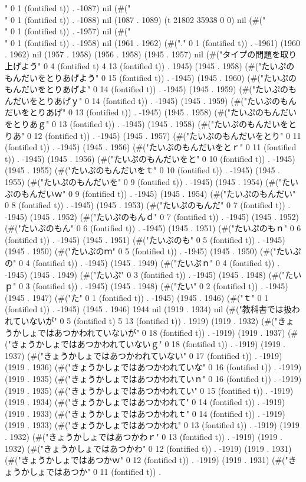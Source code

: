 " 0 1 (fontified t)) . -1087) nil (#("\\" 0 1 (fontified t)) . -1088) nil (1087 . 1089) (t 21802 35938 0 0) nil (#("\\" 0 1 (fontified t)) . -1957) nil (#("\\" 0 1 (fontified t)) . -1958) nil (1961 . 1962) (#("." 0 1 (fontified t)) . -1961) (1960 . 1962) nil (1957 . 1958) (1956 . 1958) (1945 . 1957) nil (#("タイプの問題を取り上げよう" 0 4 (fontified t) 4 13 (fontified t)) . 1945) (1945 . 1958) (#("たいぷのもんだいをとりあげよう" 0 15 (fontified t)) . -1945) (1945 . 1960) (#("たいぷのもんだいをとりあげよ" 0 14 (fontified t)) . -1945) (1945 . 1959) (#("たいぷのもんだいをとりあげｙ" 0 14 (fontified t)) . -1945) (1945 . 1959) (#("たいぷのもんだいをとりあげ" 0 13 (fontified t)) . -1945) (1945 . 1958) (#("たいぷのもんだいをとりあｇ" 0 13 (fontified t)) . -1945) (1945 . 1958) (#("たいぷのもんだいをとりあ" 0 12 (fontified t)) . -1945) (1945 . 1957) (#("たいぷのもんだいをとり" 0 11 (fontified t)) . -1945) (1945 . 1956) (#("たいぷのもんだいをとｒ" 0 11 (fontified t)) . -1945) (1945 . 1956) (#("たいぷのもんだいをと" 0 10 (fontified t)) . -1945) (1945 . 1955) (#("たいぷのもんだいをｔ" 0 10 (fontified t)) . -1945) (1945 . 1955) (#("たいぷのもんだいを" 0 9 (fontified t)) . -1945) (1945 . 1954) (#("たいぷのもんだいｗ" 0 9 (fontified t)) . -1945) (1945 . 1954) (#("たいぷのもんだい" 0 8 (fontified t)) . -1945) (1945 . 1953) (#("たいぷのもんだ" 0 7 (fontified t)) . -1945) (1945 . 1952) (#("たいぷのもんｄ" 0 7 (fontified t)) . -1945) (1945 . 1952) (#("たいぷのもん" 0 6 (fontified t)) . -1945) (1945 . 1951) (#("たいぷのもｎ" 0 6 (fontified t)) . -1945) (1945 . 1951) (#("たいぷのも" 0 5 (fontified t)) . -1945) (1945 . 1950) (#("たいぷのｍ" 0 5 (fontified t)) . -1945) (1945 . 1950) (#("たいぷの" 0 4 (fontified t)) . -1945) (1945 . 1949) (#("たいぷｎ" 0 4 (fontified t)) . -1945) (1945 . 1949) (#("たいぷ" 0 3 (fontified t)) . -1945) (1945 . 1948) (#("たいｐ" 0 3 (fontified t)) . -1945) (1945 . 1948) (#("たい" 0 2 (fontified t)) . -1945) (1945 . 1947) (#("た" 0 1 (fontified t)) . -1945) (1945 . 1946) (#("ｔ" 0 1 (fontified t)) . -1945) (1945 . 1946) 1944 nil (1919 . 1934) nil (#("教科書では扱われていないが" 0 5 (fontified t) 5 13 (fontified t)) . 1919) (1919 . 1932) (#("きょうかしょではあつかわれていないが" 0 18 (fontified t)) . -1919) (1919 . 1937) (#("きょうかしょではあつかわれていないｇ" 0 18 (fontified t)) . -1919) (1919 . 1937) (#("きょうかしょではあつかわれていない" 0 17 (fontified t)) . -1919) (1919 . 1936) (#("きょうかしょではあつかわれていな" 0 16 (fontified t)) . -1919) (1919 . 1935) (#("きょうかしょではあつかわれていｎ" 0 16 (fontified t)) . -1919) (1919 . 1935) (#("きょうかしょではあつかわれてい" 0 15 (fontified t)) . -1919) (1919 . 1934) (#("きょうかしょではあつかわれて" 0 14 (fontified t)) . -1919) (1919 . 1933) (#("きょうかしょではあつかわれｔ" 0 14 (fontified t)) . -1919) (1919 . 1933) (#("きょうかしょではあつかわれ" 0 13 (fontified t)) . -1919) (1919 . 1932) (#("きょうかしょではあつかわｒ" 0 13 (fontified t)) . -1919) (1919 . 1932) (#("きょうかしょではあつかわ" 0 12 (fontified t)) . -1919) (1919 . 1931) (#("きょうかしょではあつかｗ" 0 12 (fontified t)) . -1919) (1919 . 1931) (#("きょうかしょではあつか" 0 11 (fontified t)) . 